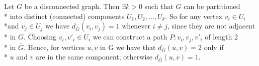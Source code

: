 Let $G$ be a disconnected graph. Then $\exists k > 0$ such that $G$ can be partitioned\\* into distinct (connected) components $U_1, U_2, \dots ,U_k$. So for any vertex $v_i \in U_i$ \\*and $v_j \in U_j$ we have $d_{\bar{G}}\left(v_i, v_j\right) = 1$  whenever $ i \neq j$, since they are not adjacent\\* in $G$. Choosing $v_i , v'_i \in U_i$ we can construct a path $P: v_i, v_j, v'_i$ of length 2\\* in $\bar{G}$. Hence, for vertices $u,v$ in G we have that $d_{\bar{G}}\left(u,v\right) = 2$  only if\\* $u$ and $v$ are in the same component;  otherwise $d_{\bar{G}}\left(u,v\right) = 1$.
